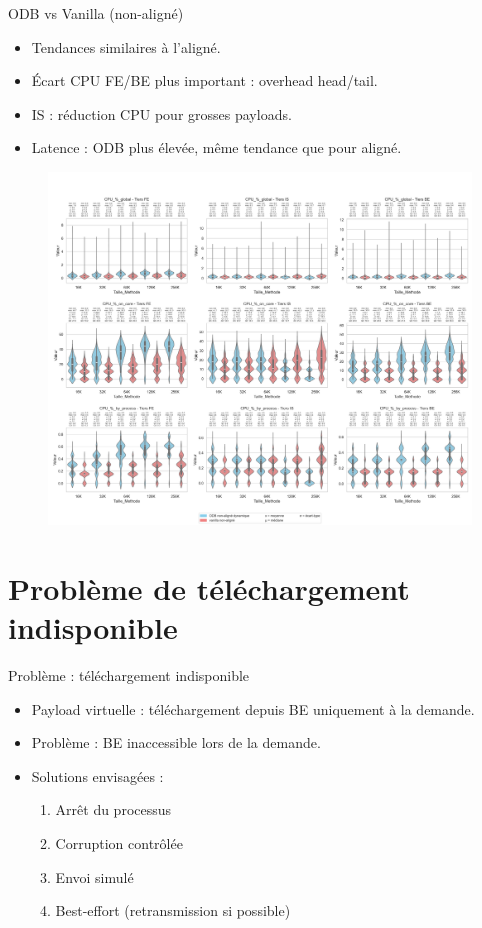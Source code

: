 \documentclass[aspectratio=43,8pt]{beamer}
\begin{document}
\begin{frame}{ODB vs Vanilla (non-aligné)}
\begin{itemize}
    \item Tendances similaires à l'aligné.
    \item Écart CPU FE/BE plus important : overhead head/tail.
    \item IS : réduction CPU pour grosses payloads.
    \item Latence : ODB plus élevée, même tendance que pour aligné.
\end{itemize}
\begin{figure}
    \includegraphics[width=\textwidth]{results/results-cmp/odb_dynamic_vs_vanilla_unaligned.png}
\end{figure}
\end{frame}

\section{Problème de téléchargement indisponible}
\begin{frame}{Problème : téléchargement indisponible}
\begin{card}
\begin{itemize}
    \item Payload virtuelle : téléchargement depuis BE uniquement à la demande.
    \item Problème : BE inaccessible lors de la demande.
    \item Solutions envisagées :
    \begin{enumerate}
        \item Arrêt du processus
        \item Corruption contrôlée
        \item Envoi simulé
        \item Best-effort (retransmission si possible)
    \end{enumerate}
\end{itemize}
\end{card}
\end{frame}
\end{document}
